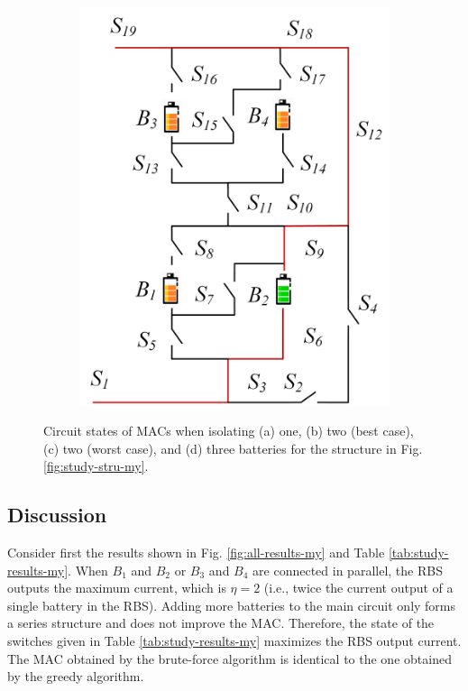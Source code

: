 \documentclass{article}
\begin{document}
\begin{figure}[htbp]
\begin{subfigure}[b]{0.31\textwidth}
          \includegraphics[width=\textwidth]{my-isolated-3.png}
          \caption{}
          \label{fig:my-isolated-3}
      \end{subfigure}
      \caption{
          Circuit states of MACs when isolating (a) one, (b) two (best case), (c) two (worst case), and (d) three batteries for the structure in Fig. \ref{fig:study-stru-my}.
          }
  \end{figure}

\subsection{Discussion}

Consider first the results shown in Fig. \ref{fig:all-results-my} and Table \ref{tab:study-results-my}.
When $B_1$ and $B_2$ or $B_3$ and $B_4$ are connected in parallel, the RBS outputs the maximum current, which is $\eta=2$ (i.e., twice the current output of a single battery in the RBS). 
Adding more batteries to the main circuit only forms a series structure and does not improve the MAC. 
Therefore, the state of the switches given in Table \ref{tab:study-results-my} maximizes the RBS output current.
The MAC obtained by the brute-force algorithm is identical to the one obtained by the greedy algorithm.
\end{document}
